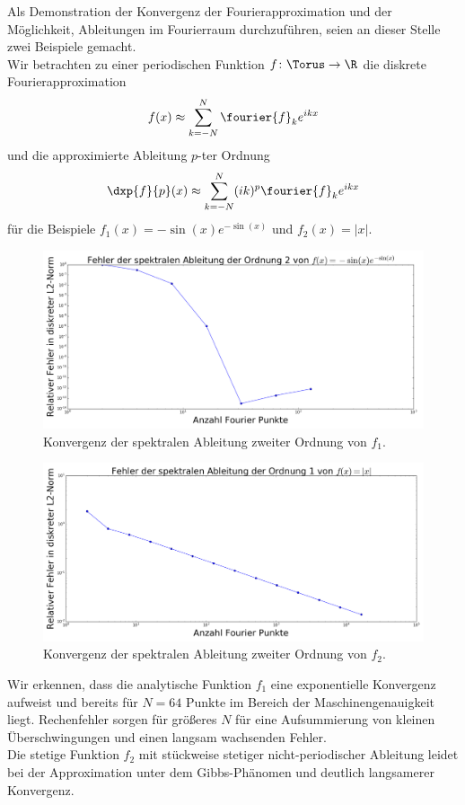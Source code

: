 \begin{mathbsp}
Als Demonstration der Konvergenz der Fourierapproximation und der Möglichkeit, Ableitungen im Fourierraum durchzuführen, seien an dieser Stelle zwei Beispiele gemacht.\\
Wir betrachten zu einer periodischen Funktion $f\colon\Torus\to\R$ die diskrete Fourierapproximation
\[f(x)\approx \sum_{k=-N}^N\fourier{f}_ke^{ikx}\]
und die approximierte Ableitung $p$-ter Ordnung
\[\dxp{f}{p}(x)\approx \sum_{k=-N}^N(ik)^p\fourier{f}_ke^{ikx}\]
für die Beispiele $f_1(x)=-\sin(x)e^{-\sin(x)}$ und $f_2(x)=|x|$.
\begin{figure}[!htb]
  \includegraphics[width=0.9\linewidth]{Figures/spectral_derivative_error_cont.png}
  \caption{Konvergenz der spektralen Ableitung zweiter Ordnung von $f_1$.}
\end{figure}
\begin{figure}[!htb]
  \includegraphics[width=0.9\linewidth]{Figures/spectral_derivative_error_discont.png}
  \caption{Konvergenz der spektralen Ableitung zweiter Ordnung von $f_2$.}
\end{figure}
Wir erkennen, dass die analytische Funktion $f_1$ eine exponentielle Konvergenz aufweist und bereits für $N=64$ Punkte im Bereich der Maschinengenauigkeit liegt. Rechenfehler sorgen für größeres $N$ für eine Aufsummierung von kleinen Überschwingungen und einen langsam wachsenden Fehler.\\
Die stetige Funktion $f_2$ mit stückweise stetiger nicht-periodischer Ableitung leidet bei der Approximation unter dem Gibbs-Phänomen und deutlich langsamerer Konvergenz.
\end{mathbsp}

